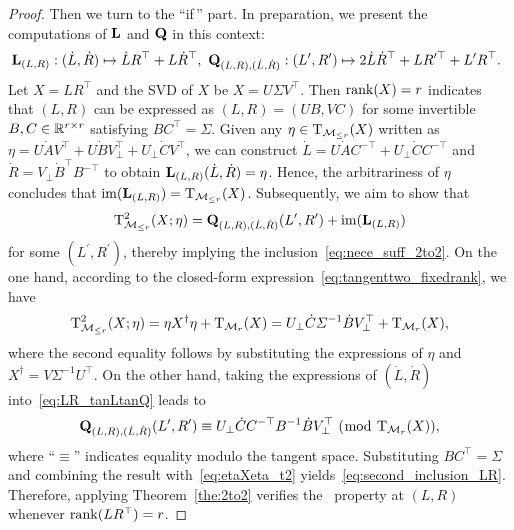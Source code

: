 \begin{proof}
Then we turn to the ``if\,'' part. In preparation, we present the computations of $\mathrm{\bf L}$ and $\mathrm{\bf Q}$ in this context:
\begin{equation}\label{eq:LR_tanLtanQ}
    \!\!\!\tanL_{(L,R)}:(\dot{L},\dot{R})\mapsto\dot{L}R^\top+L\dot{R}^\top,\ \tanQ_{(L,R),(\dot{L},\dot{R})}: (L^\prime,R^\prime)\mapsto 2\dot{L}\dot{R}^\top  + L{R}^{\prime\top} + L^{\prime}R^{\top}.
\end{equation}
Let $X=LR^\top$ and the SVD of $X$ be $X=U\varSigma V^\top$. Then $\operatorname{rank}(X)=r$ indicates that $(L,R)$ can be expressed as $(L,R)=(UB,VC)$ for some invertible $B,C\in\mathbb{R}^{r\times r}$ satisfying $BC^\top=\varSigma$. Given any $\eta\in\mathrm{T}_{\mathcal{M}_{\le r}}(X)$ written as $\eta=U\dot{A}V^\top+U\dot{B}V_\bot^\top+U_\bot\dot{C}V^\top$, we can construct $\dot{L}=U\dot{A}C^{-\top}+U_\bot\dot{C}C^{-\top}$ and $\dot{R}=V_\bot\dot{B}^\top B^{-\top}$ to obtain $\mathrm{\bf L}_{(L,R)}(\dot{L},\dot{R})=\eta$. Hence, the arbitrariness of $\eta$ concludes that $\operatorname{im}(\mathrm{\bf L}_{(L,R)})=\mathrm{T}_{\mathcal{M}_{\le r}}(X)$. Subsequently, we aim to show that 
\begin{equation}\label{eq:second_inclusion_LR}
    \mathrm{T}^2_{\mathcal{M}_{\le r}}(X;\eta)=\mathrm{\bf Q}_{(L,R),(\dot{L},\dot{R})}(L^\prime,R^\prime)+\operatorname{im}(\mathrm{\bf L}_{(L,R)})
\end{equation}
for some $(L^\prime,R^\prime)$, thereby implying the inclusion~\eqref{eq:nece_suff_2to2}. On the one hand, according to the closed-form expression~\eqref{eq:tangenttwo_fixedrank}, we have
\begin{equation}\label{eq:etaXeta_t2}
    \mathrm{T}^2_{\mathcal{M}_{\le r}}(X;\eta)=\eta X^\dagger\eta+\mathrm{T}_{\mathcal{M}_{r}}(X)= U_\bot \dot{C}\varSigma^{-1} \dot{B} V_\bot^\top + \mathrm{T}_{\mathcal{M}_{r}}(X),
\end{equation}
where the second equality follows by substituting the expressions of $\eta$ and $X^\dagger=V\varSigma^{-1}U^\top$. On the other hand, taking the expressions of $(\dot{L},\dot{R})$ into~\eqref{eq:LR_tanLtanQ} leads to
\begin{equation*}
    \mathrm{\bf Q}_{(L,R),(\dot{L},\dot{R})}(L^\prime,R^\prime)
    \equiv U_\bot \dot{C} C^{-\top} B^{-1} \dot{B} V_\bot^\top 
    \ (\bmod\ \mathrm{T}_{\mathcal{M}_{r}}(X)),
\end{equation*}
where ``$\equiv$'' indicates equality modulo the tangent space. Substituting $BC^\top=\varSigma$ and combining the result with~\eqref{eq:etaXeta_t2} yields~\eqref{eq:second_inclusion_LR}. Therefore, applying Theorem~\ref{the:2to2} verifies the \twototwo\ property at $(L,R)$ whenever $\operatorname{rank}(LR^\top)=r$.
\end{proof}


